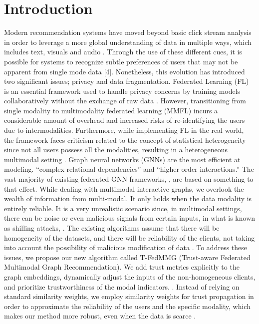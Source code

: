 \documentclass[journal]{IEEEtran} %
\begin{document}
\section{Introduction}
Modern recommendation systems have moved beyond basic click stream analysis in order to leverage a more global understanding of data in multiple ways,
which includes text, visuals and audio \cite{b1}. Through the use of these different cues, it is possible for systems to recognize subtle preferences
of users that may not be apparent from single mode data [4]. Nonetheless, this evolution has introduced two significant issues; privacy and
data fragmentation.
Federated Learning (FL) is an essential framework used to handle privacy concerns by training models collaboratively without the exchange of raw data \cite{b5}. However, transitioning from single modality to multimodality federated learning (MMFL) incurs a considerable amount of overhead and increased risks of re-identifying the users due to intermodalities. Furthermore, while implementing FL in the real world, the framework faces criticism related to the concept of statistical heterogeneity \cite{b5} since not all users possess all the modalities, resulting in a heterogeneous multimodal setting \cite{b6}.
Graph neural networks (GNNs) are the most efficient at modeling.
“complex relational dependencies” and “higher-order interactions.”
The vast majority of existing federated GNN frameworks, \cite{b2},
are based on something to that effect. While dealing with
multimodal interactive graphs, we overlook the wealth of information
from multi-modal. It only holds when the data modality is entirely reliable.
It is a very unrealistic scenario since, in multimodal settings,
there can be noise or even malicious signals from certain inputs,
in what is known as shilling attacks, \cite{b4}.
The existing algorithms assume that there will be homogeneity of the datasets, and there will be reliability of the clients, not taking into account the possibility of malicious modification of data \cite{b7}.
To address these issues, we propose our new algorithm called T-FedMMG (Trust-aware Federated Multimodal Graph Recommendation). We add trust metrics explicitly to the graph embeddings, dynamically adjust the inputs of the non-homogeneous clients, and prioritize trustworthiness of the modal indicators.
\cite{b1, b4}. Instead of relying on standard similarity weights,
we employ similarity weights for trust propagation in order to approximate the reliability
of the users and the specific modality, which makes our method more robust,
even when the data is scarce \cite{b1, b5}.
\end{document}
